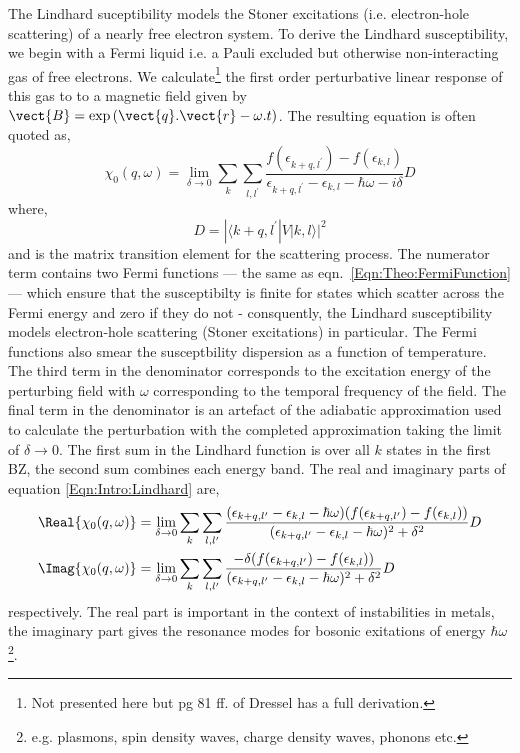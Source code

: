 The Lindhard suceptibility models the Stoner excitations (i.e. electron-hole scattering) of a nearly free electron system. To derive the Lindhard susceptibility, we begin with a Fermi liquid i.e. a Pauli excluded but otherwise non-interacting gas of free electrons. We calculate\footnote{Not presented here but pg 81 ff. of Dressel \cite{Dressel2002} has a full derivation.} the first order perturbative linear response of this gas to to a magnetic field given by $\vect{B}=\exp{(\vect{q}.\vect{r} - \omega.t})$. The resulting equation is often quoted as,
\begin{equation}
    \chi_0(q, \omega) = \lim_{\delta \to 0} \sum_{k}\sum_{l,l^\prime}\frac{f(\epsilon_{k+q,l^\prime}) - f(\epsilon_{k,l})}{\epsilon_{k+q,l^\prime} - \epsilon_{k,l} - \hbar\omega - i\delta}D
    \label{Eqn:Intro:Lindhard}
\end{equation}
where,
\begin{equation}
    D = |\langle k+q,l^\prime|V|k,l \rangle|^2
\end{equation}
and is the matrix transition element for the scattering process. The numerator term contains two Fermi functions --- the same as eqn.~\ref{Eqn:Theo:FermiFunction} --- which ensure that the susceptibilty is finite for states which scatter across the Fermi energy and zero if they do not - consquently, the Lindhard susceptibility models electron-hole scattering (Stoner excitations) in particular. The Fermi functions also smear the susceptbility dispersion as a function of temperature. The third term in the denominator corresponds to the excitation energy of the perturbing field with $\omega$ corresponding to the temporal frequency of the field. The final term in the denominator is an artefact of the adiabatic approximation used to calculate the perturbation with the completed approximation taking the limit of $\delta \to 0$. The first sum in the Lindhard function is over all $k$ states in the first \ac{BZ}, the second sum combines each energy band. The real and imaginary parts of equation \ref{Eqn:Intro:Lindhard} are,
\begin{align}
\Real\{\chi_0(q, \omega)\} &= \lim_{\delta \to 0} \sum_{k}\sum_{l, l^\prime}\frac{(\epsilon_{k+q,l^\prime} - \epsilon_{k,l} - \hbar\omega) (f(\epsilon_{k+q,l^\prime}) - f(\epsilon_{k,l}))}{(\epsilon_{k+q,l^\prime} - \epsilon_{k,l} - \hbar\omega)^2 + \delta^2}D \\
\Imag\{\chi_0(q, \omega)\} &= \lim_{\delta \to 0} \sum_{k}\sum_{l, l^\prime}\frac{-\delta (f(\epsilon_{k+q,l^\prime}) - f(\epsilon_{k,l}))}{(\epsilon_{k+q,l^\prime} - \epsilon_{k,l} - \hbar\omega)^2 + \delta^2}D\\
\end{align}
respectively. The real part is important in the context of instabilities in metals, the imaginary part gives the resonance modes for bosonic exitations of energy $\hbar\omega$\footnote{e.g. plasmons, spin density waves, charge density waves, phonons etc.}.

